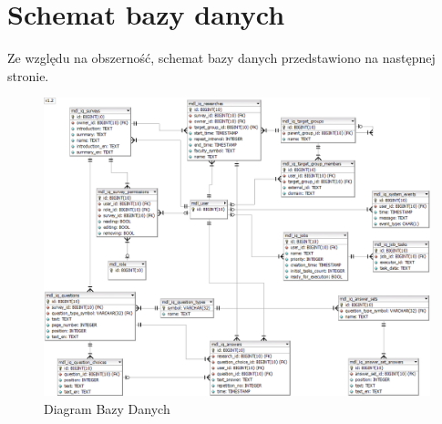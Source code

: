 \section{Schemat bazy danych}
\label{Chapter56}

Ze względu na obszerność, schemat bazy danych przedstawiono na następnej stronie.

\newpage
\begin{landscape}
\begin{figure}[th]
\centering\includegraphics[height=\textheight, width=1.5\textwidth]{figures/iQuest_Database}
\caption{Diagram Bazy Danych}\label{rys:iQuest_DataBase}
\end{figure}
\end{landscape}
